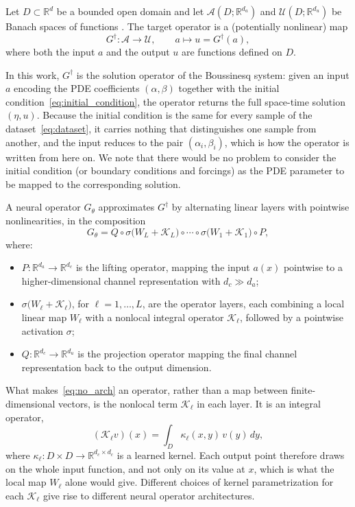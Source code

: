 Let $D \subset \mathbb{R}^{d}$ be a bounded open domain and let $\mathcal{A}(D; \mathbb{R}^{d_a})$ and $\mathcal{U}(D; \mathbb{R}^{d_u})$ be Banach spaces of functions \parencite{kreyszig1978introductory}. The target operator is a (potentially nonlinear) map
\begin{equation*}
    G^\dagger : \mathcal{A} \to \mathcal{U},
    \qquad a \mapsto u = G^\dagger(a),
\end{equation*}
where both the input $a$ and the output $u$ are functions defined on $D$.

In this work, $G^\dagger$ is the solution operator of the Boussinesq system: given an input $a$ encoding the PDE coefficients $(\alpha, \beta)$ together with the initial condition~\eqref{eq:initial_condition}, the operator returns the full space-time solution $(\eta, u)$. Because the initial condition is the same for every sample of the dataset~\eqref{eq:dataset}, it carries nothing that distinguishes one sample from another, and the input reduces to the pair $(\alpha_i, \beta_i)$, which is how the operator is written from here on. We note that there would be no problem to consider the initial condition (or boundary conditions and forcings) as the PDE parameter to be mapped to the corresponding solution.

A neural operator $G_\theta$ approximates $G^\dagger$ by alternating linear layers with pointwise nonlinearities, in the composition
\begin{equation}\label{eq:no_arch}
    G_\theta = Q \circ \sigma\Big(W_L + \mathcal{K}_L\Big) \circ \cdots \circ \sigma\Big(W_1 + \mathcal{K}_1\Big) \circ P,
\end{equation}
\noindent where:
\begin{itemize}
    \item $P : \mathbb{R}^{d_a} \to \mathbb{R}^{d_c}$ is the lifting operator, mapping the input $a(x)$ pointwise to a higher-dimensional channel representation with $d_c \gg d_a$;
    \item $\sigma\!\Big(W_\ell + \mathcal{K}_\ell\Big)$, for $\ell = 1, \ldots, L$, are the operator layers, each combining a local linear map $W_\ell$ with a nonlocal integral operator $\mathcal{K}_\ell$, followed by a pointwise activation $\sigma$;
    \item $Q : \mathbb{R}^{d_c} \to \mathbb{R}^{d_u}$ is the projection operator mapping the final channel representation back to the output dimension.
\end{itemize}
What makes~\eqref{eq:no_arch} an operator, rather than a map between finite-dimensional vectors, is the nonlocal term $\mathcal{K}_\ell$ in each layer. It is an integral operator,
\begin{equation*}
    (\mathcal{K}_\ell v)(x) = \int_{D} \kappa_\ell(x, y)\,v(y)\,dy,
\end{equation*}
where $\kappa_\ell : D \times D \to \mathbb{R}^{d_c \times d_c}$ is a learned kernel. Each output point therefore draws on the whole input function, and not only on its value at $x$, which is what the local map $W_\ell$ alone would give. Different choices of kernel parametrization for each $\mathcal{K}_\ell$ give rise to different neural operator architectures.

